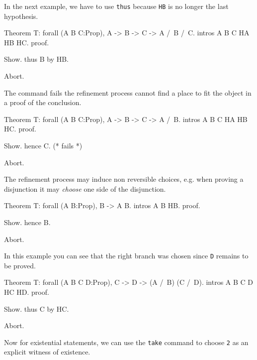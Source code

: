 In the next example, we have to use {\tt thus} because {\tt HB} is no longer
the last hypothesis.

\begin{coq_eval}
Theorem T: forall (A B C:Prop), A -> B -> C -> A /\ B /\ C.
intros A B C HA HB HC.
proof.
\end{coq_eval} 
\begin{coq_example}
Show.
thus B by HB.
\end{coq_example}
\begin{coq_eval}
Abort.
\end{coq_eval}

The command fails the refinement process cannot find a place to fit
the object in a proof of the conclusion.


\begin{coq_eval}
Theorem T: forall (A B C:Prop), A -> B -> C -> A /\ B.
intros A B C HA HB HC.
proof.
\end{coq_eval} 
\begin{coq_example}
Show.
hence C. (* fails *)
\end{coq_example}
\begin{coq_eval}
Abort.
\end{coq_eval}

The refinement process may induce non
reversible choices, e.g. when proving a disjunction it may {\it
  choose} one side of the disjunction.

\begin{coq_eval}
Theorem T: forall (A B:Prop), B -> A \/ B.
intros A B HB.
proof.
\end{coq_eval} 
\begin{coq_example}
Show.
hence B.
\end{coq_example}
\begin{coq_eval}
Abort.
\end{coq_eval}

In this example you can see that the right branch was chosen since {\tt D} remains to be proved.

\begin{coq_eval}
Theorem T: forall (A B C D:Prop), C -> D -> (A /\ B) \/ (C /\ D).
intros A B C D HC HD.
proof.
\end{coq_eval} 
\begin{coq_example}
Show.
thus C by HC.
\end{coq_example}
\begin{coq_eval}
Abort.
\end{coq_eval}

Now for existential statements, we can use the {\tt take} command to
choose {\tt 2} as an explicit witness of existence.

